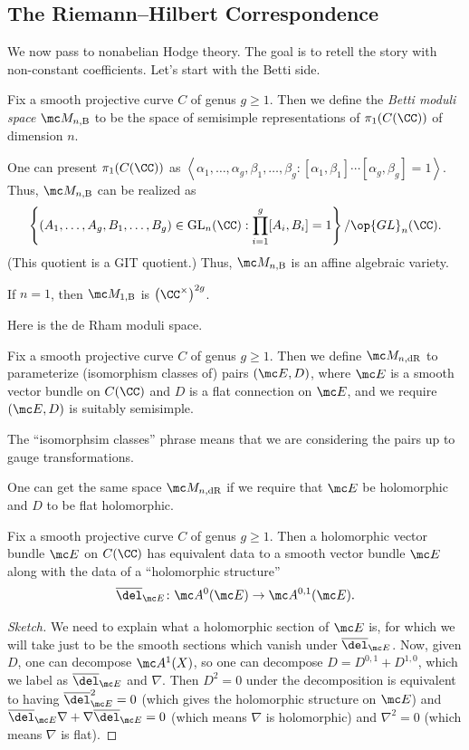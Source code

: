 \documentclass{article}
\begin{document}
\subsection{The Riemann--Hilbert Correspondence}
We now pass to nonabelian Hodge theory. The goal is to retell the story with non-constant coefficients. Let's start with the Betti side.
\begin{definition}
	Fix a smooth projective curve $C$ of genus $g\ge1$. Then we define the \textit{Betti moduli space} $\mc M_{n,\mathrm B}$ to be the space of semisimple representations of $\pi_1(C(\CC))$ of dimension $n$.
\end{definition}
\begin{remark}
	One can present $\pi_1(C(\CC))$ as $\left\langle\alpha_1,\ldots,\alpha_g,\beta_1,\ldots,\beta_g:[\alpha_1,\beta_1]\cdots[\alpha_g,\beta_g]=1\right\rangle$. Thus, $\mc M_{n,\mathrm B}$ can be realized as
	\[\left\{(A_1,\ldots,A_g,B_1,\ldots,B_g)\in\operatorname{GL}_n(\CC):\prod_{i=1}^g[A_i,B_i]=1\right\}/\op{GL}_n(\CC).\]
	(This quotient is a GIT quotient.) Thus, $\mc M_{n,\mathrm B}$ is an affine algebraic variety.
\end{remark}
\begin{example}
	If $n=1$, then $\mc M_{1,\mathrm B}$ is $\left(\CC^\times\right)^{2g}$.
\end{example}
Here is the de Rham moduli space.
\begin{definition}
	Fix a smooth projective curve $C$ of genus $g\ge1$. Then we define $\mc M_{n,\mathrm{dR}}$ to parameterize (isomorphism classes of) pairs $(\mc E,D)$, where $\mc E$ is a smooth vector bundle on $C(\CC)$ and $D$ is a flat connection on $\mc E$, and we require $(\mc E,D)$ is suitably semisimple.
\end{definition}
\begin{remark}
	The ``isomorphsim classes'' phrase means that we are considering the pairs up to gauge transformations.
\end{remark}
One can get the same space $\mc M_{n,\mathrm{dR}}$ if we require that $\mc E$ be holomorphic and $D$ to be flat holomorphic.
\begin{theorem}
	Fix a smooth projective curve $C$ of genus $g\ge1$. Then a holomorphic vector bundle $\mc E$ on $C(\CC)$ has equivalent data to a smooth vector bundle $\mc E$ along with the data of a ``holomorphic structure''
	\[\overline\del_{\mc E}\colon\mc A^0(\mc E)\to\mc A^{0,1}(\mc E).\]
\end{theorem}
\begin{proof}[Sketch]
	We need to explain what a holomorphic section of $\mc E$ is, for which we will take just to be the smooth sections which vanish under $\overline\del_{\mc E}$. Now, given $D$, one can decompose $\mc A^1(X)$, so one can decompose $D=D^{0,1}+D^{1,0}$, which we label as $\overline\del_{\mc E}$ and $\nabla$. Then $D^2=0$ under the decomposition is equivalent to having $\overline\del_{\mc E}^2=0$ (which gives the holomorphic structure on $\mc E$) and $\overline\del_{\mc E}\nabla+\nabla\overline\del_{\mc E}=0$ (which means $\nabla$ is holomorphic) and $\nabla^2=0$ (which means $\nabla$ is flat).
\end{proof}
\end{document}
